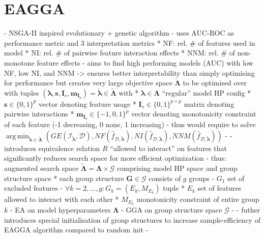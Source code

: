 \documentclass[twoside,11pt]{article}
\DeclareMathOperator*{\argmin}{arg\,min}
\begin{document}
\section{EAGGA}
- NSGA-II inspired evolutionary + genetic algorithm
- uses AUC-ROC as performance metric and 3 interpretation metrics
  * NF: rel. \# of features used in model
  * NI: rel. \# of pairwise feature interaction effects
  * NNM: rel. \# of non-monotone feature effects
- aims to find high performing models (AUC) with low NF, low NI, and NNM -> ensures better interpretability than simply optimising for performance
  but creates very large objective space $\check{\boldsymbol\Lambda}$ to be optimised over with
  tuples $(\boldsymbol\lambda, \boldsymbol{s}, \boldsymbol{I}_s, \boldsymbol{m}_{\boldsymbol{I}_{\boldsymbol{s}}})=\check{\boldsymbol\lambda}\in\check{\boldsymbol\Lambda}$
  with
  * $\boldsymbol\lambda\in\boldsymbol\Lambda$ ``regular'' model HP config
  * $\boldsymbol{s}\in\{0,1\}^p$ vector denoting feature usage
  * $\boldsymbol{I}_s\in\{0,1\}^{p\times p}$ matrix denoting pairwise interactions
  * $\boldsymbol{m}_{\boldsymbol{I}_{\boldsymbol{s}}}\in\{-1,0,1\}^p$ vector denoting monotonicity constraint of each feature (-1 decreasing, 0 none, 1 increasing)
- thus would require to solve $\argmin_{\check{\boldsymbol\lambda}\in\check{\boldsymbol\Lambda}} (GE(\mathcal{I}_{\check{\boldsymbol\lambda}},\mathcal{D}),NF(\hat{f}_{\mathcal{D},\check{\boldsymbol\lambda}}),NI(\hat{f}_{\mathcal{D},\check{\boldsymbol\lambda}}),NNM(\hat{f}_{\mathcal{D},\check{\boldsymbol\lambda}}))$
- \citep[pp. 540f]{EAGGA}
- introduces equivalence relation $R$ ``allowed to interact'' on features that significantly reduces search space for more efficient optimization
- thus: augmented search space $\tilde{\boldsymbol\Lambda}=\boldsymbol\Lambda\times\mathcal{G}$ comprising model HP space and group structure space
  * each group structure $\boldsymbol{G}\in\mathcal{G}$ consists of $g$ groups
    - $G_1$ set of excluded features
    - $\forall k=2,...,g:G_k=(E_k,M_{E_k})$ tuple
      * $E_k$ set of features allowed to interact with each other
      * $M_{E_k}$ monotonicity constraint of entire group $k$
- EA on model hyperparameters $\boldsymbol\Lambda$
- GGA on group structure space $\mathcal{G}$
- \citep[pp. 541f]{EAGGA}
- futher introduces special initialisation of group structures to increase sample-efficiency of EAGGA algorithm compared to random init
- \citep[pp. 542f]{EAGGA}
\end{document}
